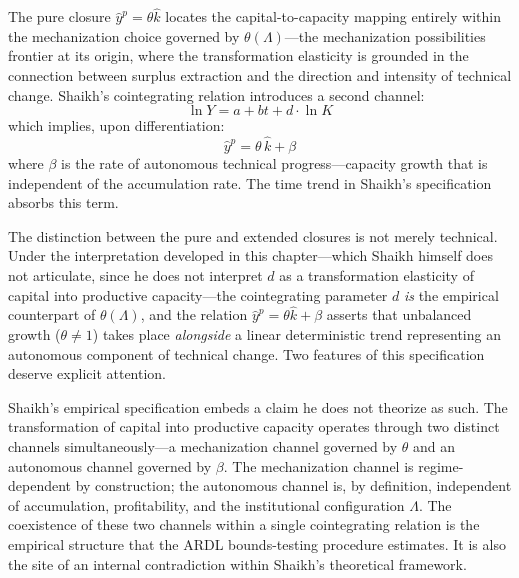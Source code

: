 \documentclass[11pt,a4paper]{article}
\begin{document}
The pure closure $\hat{y}^p = \theta\hat{k}$ locates the capital-to-capacity mapping entirely within the mechanization choice governed by $\theta(\Lambda)$---the mechanization possibilities frontier at its origin, where the transformation elasticity is grounded in the connection between surplus extraction and the direction and intensity of technical change. Shaikh's cointegrating relation introduces a second channel:
%
\begin{equation}\label{eq:shaikh_coint}
	\ln Y = a + bt + d \cdot \ln K
\end{equation}
%
which implies, upon differentiation:
%
\begin{equation}\label{eq:extended_closure}
	\hat{y}^p = \theta\,\hat{k} + \beta
\end{equation}
%
where $\beta$ is the rate of autonomous technical progress---capacity growth that is independent of the accumulation rate. The time trend in Shaikh's specification absorbs this term.

The distinction between the pure and extended closures is not merely technical. Under the interpretation developed in this chapter---which Shaikh himself does not articulate, since he does not interpret $d$ as a transformation elasticity of capital into productive capacity---the cointegrating parameter $d$ \emph{is} the empirical counterpart of $\theta(\Lambda)$, and the relation $\hat{y}^p = \theta\hat{k} + \beta$ asserts that unbalanced growth ($\theta \neq 1$) takes place \emph{alongside} a linear deterministic trend representing an autonomous component of technical change. Two features of this specification deserve explicit attention.

Shaikh's empirical specification embeds a claim he does not theorize as such. The transformation of capital into productive capacity operates through two distinct channels simultaneously---a mechanization channel governed by $\theta$ and an autonomous channel governed by $\beta$. The mechanization channel is regime-dependent by construction; the autonomous channel is, by definition, independent of accumulation, profitability, and the institutional configuration $\Lambda$. The coexistence of these two channels within a single cointegrating relation is the empirical structure that the ARDL bounds-testing procedure estimates. It is also the site of an internal contradiction within Shaikh's theoretical framework.
\end{document}
